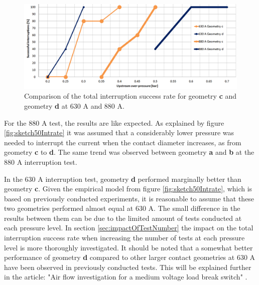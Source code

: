 \documentclass[10pt,b5paper,twoside]{article}
\begin{document}
\begin{figure}[H]
\centering
\includegraphics[scale=0.5, angle =90 ]{Bilder/Results/compGeoCandDNew.PNG}
\caption{Comparison of the total interruption success rate for geometry \textbf{c} and geometry \textbf{d} at 630 A and 880 A.} \label{fig:compgeoCandDAllcurrents}
\end{figure}

For the 880 A test, the results are like expected. As explained by figure \ref{fig:sketch50Intrate} it was assumed that a considerably lower pressure was needed to interrupt the current when the contact diameter increases, as from geometry \textbf{c} to \textbf{d}. The same trend was observed between geometry \textbf{a} and \textbf{b} at the 880 A interruption test.

In the 630 A interruption test, geometry \textbf{d} performed marginally better than geometry \textbf{c}. Given the empirical model from figure \ref{fig:sketch50Intrate}, which is based on previously conducted experiments, it is reasonable to assume that these two geometries performed almost equal at 630 A. The small difference in the results between them can be due to the limited amount of tests conducted at each pressure level. In section \ref{sec:impactOfTestNumber} the impact on the total interruption success rate when increasing the number of tests at each pressure level is more thoroughly investigated. It should be noted that a somewhat better performance of geometry \textbf{d} compared to other larger contact geometries at 630 A have been observed in previously conducted tests. This will be explained further in the article: "Air flow investigation for a medium voltage load break switch" \cite{bib:AFIMVLBA}.

\end{document}
